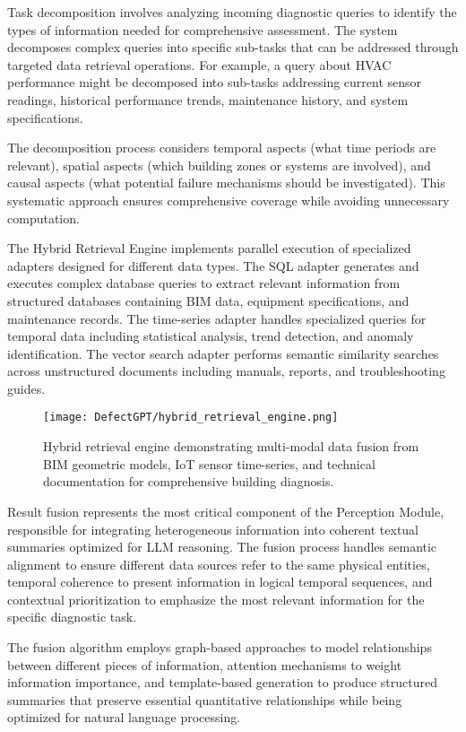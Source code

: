 Task decomposition involves analyzing incoming diagnostic queries to identify the types of information needed for comprehensive assessment. The system decomposes complex queries into specific sub-tasks that can be addressed through targeted data retrieval operations. For example, a query about HVAC performance might be decomposed into sub-tasks addressing current sensor readings, historical performance trends, maintenance history, and system specifications.

The decomposition process considers temporal aspects (what time periods are relevant), spatial aspects (which building zones or systems are involved), and causal aspects (what potential failure mechanisms should be investigated). This systematic approach ensures comprehensive coverage while avoiding unnecessary computation.

The Hybrid Retrieval Engine implements parallel execution of specialized adapters designed for different data types. The SQL adapter generates and executes complex database queries to extract relevant information from structured databases containing BIM data, equipment specifications, and maintenance records. The time-series adapter handles specialized queries for temporal data including statistical analysis, trend detection, and anomaly identification. The vector search adapter performs semantic similarity searches across unstructured documents including manuals, reports, and troubleshooting guides.

\begin{figure}[htbp]
\centering
\texttt{[image: DefectGPT/hybrid\_retrieval\_engine.png]}
\caption{Hybrid retrieval engine demonstrating multi-modal data fusion from BIM geometric models, IoT sensor time-series, and technical documentation for comprehensive building diagnosis.}
\label{fig:hybrid_retrieval_engine}
\end{figure}

Result fusion represents the most critical component of the Perception Module, responsible for integrating heterogeneous information into coherent textual summaries optimized for LLM reasoning. The fusion process handles semantic alignment to ensure different data sources refer to the same physical entities, temporal coherence to present information in logical temporal sequences, and contextual prioritization to emphasize the most relevant information for the specific diagnostic task.

The fusion algorithm employs graph-based approaches to model relationships between different pieces of information, attention mechanisms to weight information importance, and template-based generation to produce structured summaries that preserve essential quantitative relationships while being optimized for natural language processing.

